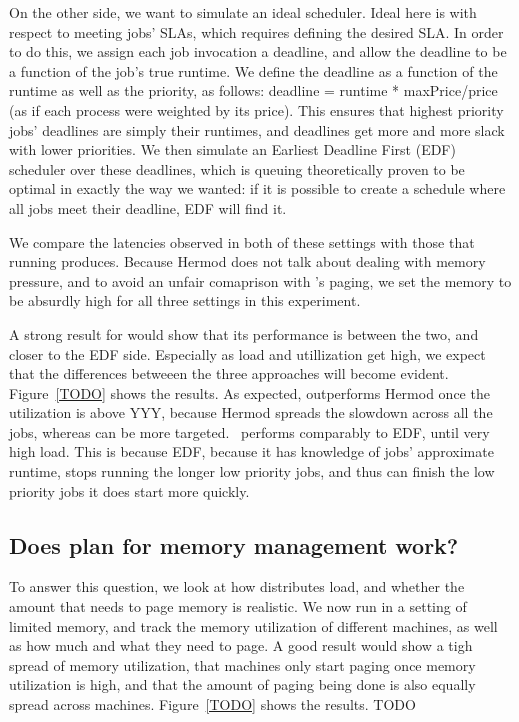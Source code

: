 On the other side, we want to simulate an ideal scheduler. Ideal here is with
respect to meeting jobs' SLAs, which requires defining the desired SLA. In order
to do this, we assign each job invocation a deadline, and allow the deadline to
be a function of the job's true runtime. We define the deadline as a function of
the runtime as well as the priority, as follows: deadline = runtime *
maxPrice/price (as if each process were weighted by its price). This ensures
that highest priority jobs' deadlines are simply their runtimes, and deadlines
get more and more slack with lower priorities. We then simulate an Earliest
Deadline First (EDF) scheduler over these deadlines, which is queuing
theoretically proven to be optimal in exactly the way we wanted: if it is
possible to create a schedule where all jobs meet their deadline, EDF will find
it\cite{TODO}.

We compare the latencies observed in both of these settings with those that
running \sys{} produces. Because Hermod does not talk about dealing with memory
pressure, and to avoid an unfair comaprison with \sys{}'s paging, we set the
memory to be absurdly high for all three settings in this experiment. 

A strong result for \sys{} would show that its performance is between the two,
and closer to the EDF side. Especially as load and utillization get high, we
expect that the differences betweeen the three approaches will become evident.
Figure~\ref{TODO} shows the results. As expected, \sys{} outperforms Hermod once
the utilization is above YYY, because Hermod spreads the slowdown across all the
jobs, whereas \sys{} can be more targeted.~\sys{} performs comparably to EDF,
until very high load. This is because EDF, because it has knowledge of jobs'
approximate runtime, stops running the longer low priority jobs, and thus can
finish the low priority jobs it does start more quickly.


\subsection{Does \sys{} plan for memory management work?}

To answer this question, we look at how \sys{} distributes load, and whether the
amount that \sys{} needs to page memory is realistic. We now run \sys{} in a
setting of limited memory, and track the memory utilization of different
machines, as well as how much and what they need to page. A good result would
show a tigh spread of memory utilization, that machines only start paging once
memory utilization is high, and that the amount of paging being done is also
equally spread across machines. Figure~\ref{TODO} shows the results. TODO


